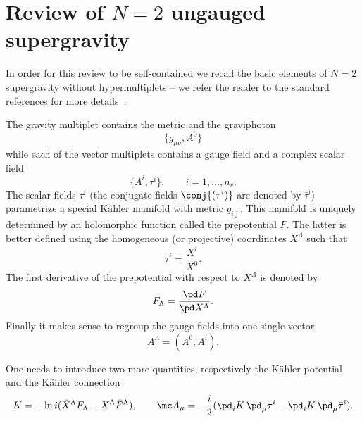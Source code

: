 \section{Review of \texorpdfstring{$N=2$}{N = 2} ungauged supergravity}
\label{app:N=2-sugra}


In order for this review to be self-contained we recall the basic elements of $N = 2$ supergravity without hypermultiplets -- we refer the reader to the standard references for more details~\cite{Freedman:2012:Supergravity, Andrianopoli:1996:GeneralMatterCoupled, Andrianopoli:1997:N2SupergravityN2}.

The gravity multiplet contains the metric and the graviphoton
\begin{equation}
	\{ g_{\mu\nu}, A^0 \}
\end{equation} 
while each of the vector multiplets contains a gauge field and a complex scalar field
\begin{equation}
	\{ A^i, \tau^i \}, \qquad i = 1, \ldots, n_v.
\end{equation} 
The scalar fields $\tau^i$ (the conjugate fields $\conj{(\tau^i)}$ are denoted by $\bar\tau^{\bar\imath}$) parametrize a special Kähler manifold with metric $g_{i\bar\jmath}$.
This manifold is uniquely determined by an holomorphic function called the prepotential $F$.
The latter is better defined using the homogeneous (or projective) coordinates $X^\Lambda$ such that
\begin{equation}
	\tau^i = \frac{X^i}{X^0}.
\end{equation} 
The first derivative of the prepotential with respect to $X^\Lambda$ is denoted by
\begin{equation}
	F_\Lambda = \frac{\pd F}{\pd X^\Lambda}.
\end{equation} 
Finally it makes sense to regroup the gauge fields into one single vector
\begin{equation}
	A^\Lambda = (A^0, A^i).
\end{equation} 

One needs to introduce two more quantities, respectively the Kähler potential and the Kähler connection
\begin{equation}
	K = - \ln i (\bar X^\Lambda F_\Lambda - X^\Lambda \bar F^\Lambda), \qquad
	\mc A_\mu = - \frac{i}{2} (\pd_i K\, \pd_\mu \tau^i - \pd_{\bar\imath} K\, \pd_\mu \bar\tau^{\bar\imath}).
\end{equation} 

